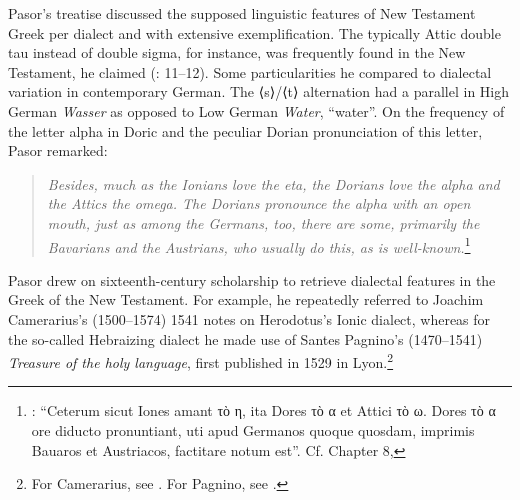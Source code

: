 Pasor’s treatise discussed the supposed linguistic features of New Testament Greek per dialect and with extensive exemplification. The typically Attic double tau instead of double sigma, for instance, was frequently found in the New Testament, he claimed (\citealt{Pasor1632}: 11–12). Some particularities he compared to dialectal variation in contemporary German. The ⟨s⟩/⟨t⟩ alternation had a parallel in High German \textit{Wasser} as opposed to Low German \textit{Water}, “water”. On the frequency of the letter alpha in Doric and the peculiar Dorian pronunciation of this letter, Pasor remarked:

\begin{quote}
\emph{\textup{Besides,} \emph{much} \emph{as} \emph{the} \emph{Ionians} \emph{love} \emph{the} \emph{eta,} \emph{the} \emph{Dorians} \emph{love} \emph{the} \emph{alpha} \emph{and} \emph{the} \emph{Attics} \emph{the} \emph{omega.} \emph{The} \emph{Dorians} \emph{pronounce} \emph{the} \emph{alpha} \emph{with} \emph{an} \emph{open} \emph{mouth,} \emph{just} \emph{as} \emph{among} \emph{the} \emph{Germans,} \emph{too,} \emph{there} \emph{are} \emph{some,} \emph{primarily} \emph{the} \emph{Bavarians} \emph{and} \emph{the} \emph{Austrians,} \emph{who} \emph{usually} \emph{do} \emph{this,} \emph{as} \emph{is} \emph{well-known.}}\footnote{\citet[28]{Pasor1632}: “Ceterum sicut Iones amant τὸ η, ita Dores τὸ α et Attici τὸ ω. Dores τὸ α ore diducto pronuntiant, uti apud Germanos quoque quosdam, imprimis Bauaros et Austriacos, factitare notum est”. Cf. Chapter 8, }
\end{quote}

Pasor drew on sixteenth-century scholarship to retrieve dialectal features in the Greek of the New Testament. For example, he repeatedly referred to Joachim Camerarius’s (1500–1574) 1541 notes on Herodotus’s Ionic dialect, whereas for the so-called Hebraizing dialect he made use of Santes Pagnino’s (1470–1541) \textit{Treasure of the holy language}, first published in 1529 in Lyon.\footnote{For Camerarius, see \citet[24--25, 27--28]{Pasor1632}. For Pagnino, see \citet[36]{Pasor1632}.}

